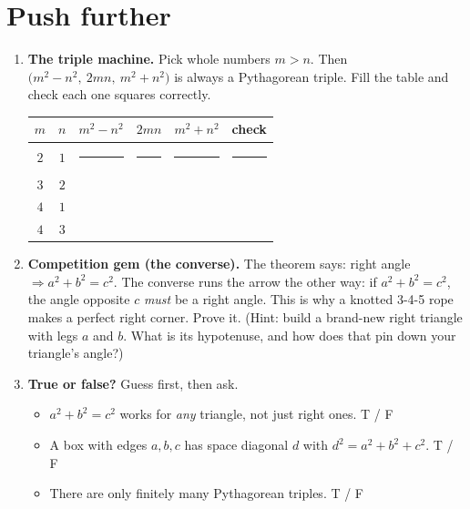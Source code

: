 \documentclass[11pt]{article}
\newcommand{\drawbox}[1]{%
  \par\vspace{4pt}\noindent
  \fbox{\rule{0pt}{#1}\rule{\dimexpr\linewidth-2\fboxsep-2\fboxrule}{0pt}}%
  \par\vspace{6pt}}
\begin{document}
\section*{Push further}
\begin{enumerate}[leftmargin=*]
  \item \textbf{The triple machine.} Pick whole numbers $m > n$. Then
        $\big(m^2 - n^2,\ 2mn,\ m^2 + n^2\big)$ is always a Pythagorean triple.
        Fill the table and check each one squares correctly.

        \medskip
        \begin{center}
        \begin{tabular}{c c | c c c | c}
          $m$ & $n$ & $m^2-n^2$ & $2mn$ & $m^2+n^2$ & check \\ \hline
          $2$ & $1$ & \rule{1.4cm}{0pt} & \rule{1.4cm}{0pt} & \rule{1.4cm}{0pt} & \rule{2.4cm}{0pt}\\[7pt]
          $3$ & $2$ & & & & \\[7pt]
          $4$ & $1$ & & & & \\[7pt]
          $4$ & $3$ & & & & \\[7pt]
        \end{tabular}
        \end{center}

  \item \textbf{Competition gem (the converse).} The theorem says: right angle
        $\Rightarrow a^2+b^2=c^2$. The converse runs the arrow the other way: if
        $a^2+b^2=c^2$, the angle opposite $c$ \emph{must} be a right angle. This
        is why a knotted 3-4-5 rope makes a perfect right corner. Prove it. (Hint:
        build a brand-new right triangle with legs $a$ and $b$. What is its
        hypotenuse, and how does that pin down your triangle's angle?)
        \drawbox{1.7cm}

  \item \textbf{True or false?} Guess first, then ask.
        \begin{itemize}
          \item $a^2+b^2=c^2$ works for \emph{any} triangle, not just right ones.
                \hfill T \quad / \quad F
          \item A box with edges $a,b,c$ has space diagonal $d$ with
                $d^2=a^2+b^2+c^2$. \hfill T \quad / \quad F
          \item There are only finitely many Pythagorean triples.
                \hfill T \quad / \quad F
        \end{itemize}
\end{enumerate}
\end{document}

